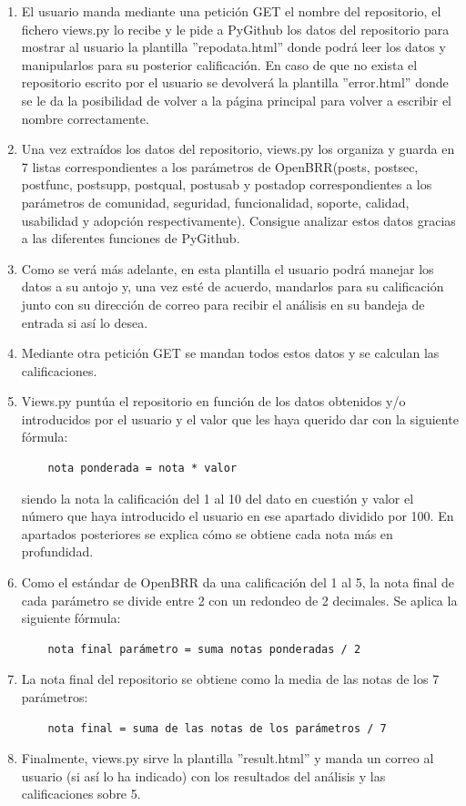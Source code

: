 \documentclass[a4paper, 12pt]{book}
\begin{document}
\begin{enumerate}
	\item El usuario manda mediante una petición GET el nombre del repositorio, el fichero views.py lo recibe y le pide a PyGithub los datos del repositorio para mostrar al usuario la plantilla ''repo\textunderscore data.html'' donde podrá leer los datos y manipularlos para su posterior calificación. En caso de que no exista el repositorio escrito por el usuario se devolverá la plantilla ''error.html'' donde se le da la posibilidad de volver a la página principal para volver a escribir el nombre correctamente.
	\item Una vez extraídos los datos del repositorio, views.py los organiza y guarda en 7 listas correspondientes a los parámetros de OpenBRR(posts, post\textunderscore sec, post\textunderscore func, post\textunderscore supp, post\textunderscore qual, post\textunderscore usab y post\textunderscore adop correspondientes a los parámetros de comunidad, seguridad, funcionalidad, soporte, calidad, usabilidad y adopción respectivamente). Consigue analizar estos datos gracias a las diferentes funciones de PyGithub.
	\item Como se verá más adelante, en esta plantilla el usuario podrá manejar los datos a su antojo y, una vez esté de acuerdo, mandarlos para su calificación junto con su dirección de correo para recibir el análisis en su bandeja de entrada si así lo desea.
	\item Mediante otra petición GET se mandan todos estos datos y se calculan las calificaciones.
	\item Views.py puntúa el repositorio en función de los datos obtenidos y/o introducidos por el usuario y el valor que les haya querido dar con la siguiente fórmula: \begin{verbatim}
	nota ponderada = nota * valor
	\end{verbatim}
	siendo la nota la calificación del 1 al 10 del dato en cuestión y valor el número que haya introducido el usuario en ese apartado dividido por 100. En apartados posteriores se explica cómo se obtiene cada nota más en profundidad.
	\item Como el estándar de OpenBRR da una calificación del 1 al 5, la nota final de cada parámetro se divide entre 2 con un redondeo de 2 decimales. Se aplica la siguiente fórmula:
	\begin{verbatim}
	nota final parámetro = suma notas ponderadas / 2
	\end{verbatim}
	\item La nota final del repositorio se obtiene como la media de las notas de los 7 parámetros:
	\begin{verbatim}
	nota final = suma de las notas de los parámetros / 7
	\end{verbatim}
	\item Finalmente, views.py sirve la plantilla ''result.html'' y manda un correo al usuario (si así lo ha indicado) con los resultados del análisis y las calificaciones sobre 5.
\end{enumerate}
\end{document}
